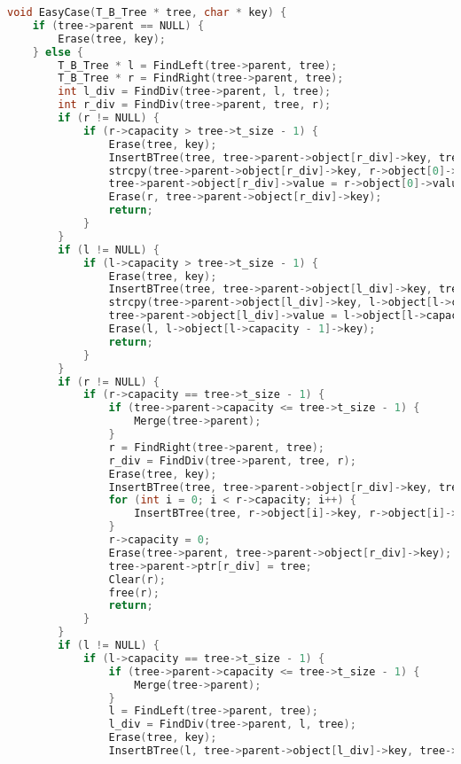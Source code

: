 \begin{lstlisting}[language=C]
void EasyCase(T_B_Tree * tree, char * key) {
    if (tree->parent == NULL) {
        Erase(tree, key);
    } else {
        T_B_Tree * l = FindLeft(tree->parent, tree);
        T_B_Tree * r = FindRight(tree->parent, tree);
        int l_div = FindDiv(tree->parent, l, tree);
        int r_div = FindDiv(tree->parent, tree, r);
        if (r != NULL) {
            if (r->capacity > tree->t_size - 1) {
                Erase(tree, key);
                InsertBTree(tree, tree->parent->object[r_div]->key, tree->parent->object[r_div]->value, NULL, NULL);
                strcpy(tree->parent->object[r_div]->key, r->object[0]->key);
                tree->parent->object[r_div]->value = r->object[0]->value;
                Erase(r, tree->parent->object[r_div]->key);
                return;
            }
        }
        if (l != NULL) {
            if (l->capacity > tree->t_size - 1) {
                Erase(tree, key);
                InsertBTree(tree, tree->parent->object[l_div]->key, tree->parent->object[l_div]->value, NULL, NULL);
                strcpy(tree->parent->object[l_div]->key, l->object[l->capacity - 1]->key);
                tree->parent->object[l_div]->value = l->object[l->capacity - 1]->value;
                Erase(l, l->object[l->capacity - 1]->key);
                return;
            }
        }
        if (r != NULL) {
            if (r->capacity == tree->t_size - 1) {
                if (tree->parent->capacity <= tree->t_size - 1) {
                    Merge(tree->parent);
                }
                r = FindRight(tree->parent, tree);
                r_div = FindDiv(tree->parent, tree, r);
                Erase(tree, key);
                InsertBTree(tree, tree->parent->object[r_div]->key, tree->parent->object[r_div]->value, NULL, NULL);
                for (int i = 0; i < r->capacity; i++) {
                    InsertBTree(tree, r->object[i]->key, r->object[i]->value, r->ptr[i], r->ptr[i + 1]);
                }
                r->capacity = 0;
                Erase(tree->parent, tree->parent->object[r_div]->key);
                tree->parent->ptr[r_div] = tree;
                Clear(r);
                free(r);
                return;
            }
        }
        if (l != NULL) {
            if (l->capacity == tree->t_size - 1) {
                if (tree->parent->capacity <= tree->t_size - 1) {
                    Merge(tree->parent);
                }
                l = FindLeft(tree->parent, tree);
                l_div = FindDiv(tree->parent, l, tree);
                Erase(tree, key);
                InsertBTree(l, tree->parent->object[l_div]->key, tree->parent->object[l_div]->value, NULL, NULL);

\end{lstlisting}
